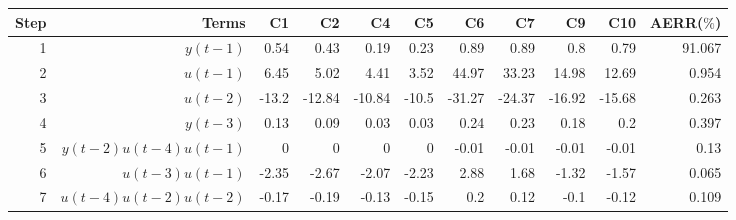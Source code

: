 \begin{tabular}{rrrrrrrrrrr}
Step & Terms & C1 & C2 & C4 & C5 & C6 & C7 & C9 & C10 & AERR($\%$) \\ 
\hline 
1 & $y(t-1)$ & 0.54 & 0.43 & 0.19 & 0.23 & 0.89 & 0.89 & 0.8 & 0.79 & 91.067 \\ 
2 & $u(t-1)$ & 6.45 & 5.02 & 4.41 & 3.52 & 44.97 & 33.23 & 14.98 & 12.69 & 0.954 \\ 
3 & $u(t-2)$ & -13.2 & -12.84 & -10.84 & -10.5 & -31.27 & -24.37 & -16.92 & -15.68 & 0.263 \\ 
4 & $y(t-3)$ & 0.13 & 0.09 & 0.03 & 0.03 & 0.24 & 0.23 & 0.18 & 0.2 & 0.397 \\ 
5 & $y(t-2)u(t-4)u(t-1)$ & 0 & 0 & 0 & 0 & -0.01 & -0.01 & -0.01 & -0.01 & 0.13 \\ 
6 & $u(t-3)u(t-1)$ & -2.35 & -2.67 & -2.07 & -2.23 & 2.88 & 1.68 & -1.32 & -1.57 & 0.065 \\ 
7 & $u(t-4)u(t-2)u(t-2)$ & -0.17 & -0.19 & -0.13 & -0.15 & 0.2 & 0.12 & -0.1 & -0.12 & 0.109 \\ 
\hline 
\end{tabular}